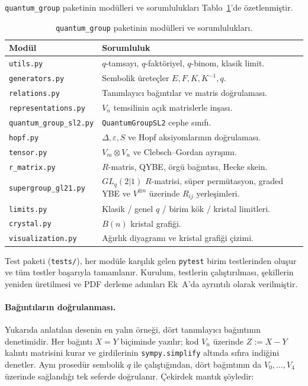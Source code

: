 \documentclass[10pt]{math}
\numberwithin{equation}{section}
\theoremstyle{plain}
\theoremstyle{definition}
\newcommand{\eps}{\varepsilon}
\newcommand{\cop}{\Delta}
\begin{document}
\texttt{quantum\_group} paketinin modülleri ve sorumlulukları
Tablo~\ref{tab:modules}'de özetlenmiştir.

\begin{table}[h]
\centering
\small
\caption{\texttt{quantum\_group} paketinin modülleri ve sorumlulukları.}
\label{tab:modules}
\begin{tabularx}{\textwidth}{@{}>{\raggedright\arraybackslash}p{}X@{}}
\toprule
Modül & Sorumluluk \\
\midrule
\texttt{utils.py} & $q$-tamsayı, $q$-faktöriyel, $q$-binom, klasik limit. \\
\texttt{generators.py} & Sembolik üreteçler $E, F, K, K^{-1}, q$. \\
\texttt{relations.py} & Tanımlayıcı bağıntılar ve matris doğrulaması. \\
\texttt{representations.py} & $V_n$ temsilinin açık matrislerle inşası. \\
\texttt{quantum\_group\_sl2.py} & \texttt{QuantumGroupSL2} cephe sınıfı. \\
\texttt{hopf.py} & $\cop, \eps, S$ ve Hopf aksiyomlarının doğrulaması. \\
\texttt{tensor.py} & $V_m \otimes V_n$ ve Clebsch--Gordan ayrışımı. \\
\texttt{r\_matrix.py} & $R$-matris, QYBE, örgü bağıntısı, Hecke skein. \\
\texttt{supergroup\_gl21.py} & $GL_q(2|1)$ $R$-matrisi, süper permütasyon, graded YBE ve $V^{\otimes n}$ üzerinde $R_{ij}$ yerleşimleri. \\
\texttt{limits.py} & Klasik / genel $q$ / birim kök / kristal limitleri. \\
\texttt{crystal.py} & $B(n)$ kristal grafiği. \\
\texttt{visualization.py} & Ağırlık diyagramı ve kristal grafiği çizimi. \\
\bottomrule
\end{tabularx}
\end{table}

Test paketi (\texttt{tests/}), her modüle karşılık gelen \texttt{pytest} birim
testlerinden oluşur ve tüm testler başarıyla tamamlanır. Kurulum, testlerin
çalıştırılması, şekillerin yeniden üretilmesi ve PDF derleme adımları
Ek~A'da ayrıntılı olarak verilmiştir.

\paragraph{Bağıntıların doğrulanması.} Yukarıda anlatılan desenin en yalın
örneği, dört tanımlayıcı bağıntının denetimidir. Her bağıntı $X = Y$ biçiminde
yazılır; kod $V_n$ üzerinde $Z := X - Y$ kalıntı matrisini kurar ve girdilerinin
\texttt{sympy.simplify} altında sıfıra indiğini denetler. Aynı prosedür sembolik
$q$ ile çalıştığından, dört bağıntının da $V_0,\dots,V_4$ üzerinde sağlandığı
tek seferde doğrulanır. Çekirdek mantık şöyledir:
\end{document}
